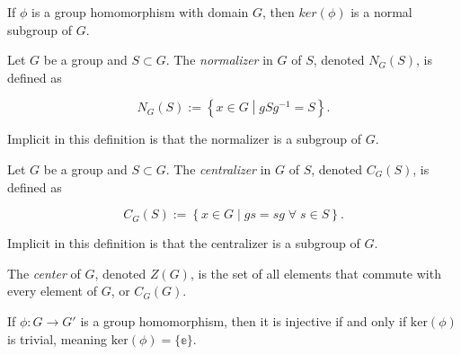 \begin{theorem}
    \label{theorem : Kernel_normal}
    \leanok
    If $\phi$ is a group homomorphism with domain $G$, then $ker(\phi)$ is a normal subgroup of $G$.
\end{theorem}

\begin{definition}
    \label{definition : Normalizer}
    \leanok
    Let $G$ be a group and $S \subset G$. The \textit{normalizer} in $G$ of $S$, denoted $N_G(S)$, is defined as

    $$N_G(S) := \left\{ x \in G \middle| gSg^{-1} = S \right\}.$$

    Implicit in this definition is that the normalizer is a subgroup of $G$.
\end{definition}

\begin{definition}
    \label{definition : Centralizer}
    \leanok
    Let $G$ be a group and $S \subset G$. The \textit{centralizer} in $G$ of $S$, denoted $C_G(S)$, is defined as

    $$C_G(S) := \left\{ x \in G \middle| gs = sg\;\forall\;s \in S\right\}.$$

    Implicit in this definition is that the centralizer is a subgroup of $G$.
\end{definition}

\begin{definition}
    \label{definition : Center}
    \leanok
    The \textit{center} of $G$, denoted $Z(G)$, is the set of all elements that commute with every element of $G$, or $C_G(G)$.
\end{definition}

\begin{theorem}
    \label{theorem : homomorphism_inj_iff_kernel_trivial}
    \leanok
    If $\phi : G \rightarrow G'$ is a group homomorphism, then it is injective if and only if $\text{ker}(\phi)$ is trivial, meaning $\text{ker}(\phi) = \{\mathbb{e}\}$.
\end{theorem}
